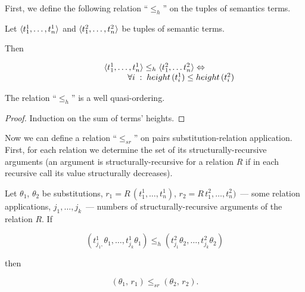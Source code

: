 
First, we define the following relation ``$\leq_h$'' on the tuples of semantics terms.

\begin{definition}
  Let $\langle t_1^1, \dots, t_n^1 \rangle$ and $\langle t_1^2, \dots, t_n^2 \rangle$ be tuples of semantic terms. 

  Then

  \[
  \begin{array}{c}
  \langle t_1^1, \ldots, t_n^1 \rangle \leq_h \langle t_1^2, \ldots t_n^2 \rangle \Leftrightarrow\\
  \phantom{XXXXXXX}\forall i\;:\;height\,(t_i^1) \leq height\,(t_i^2)
  \end{array}
  \]
\end{definition}


\begin{lemma}
\label{lemma:wqo1}
The relation ``$\leq_h$'' is a well quasi-ordering.
\end{lemma}
\begin{proof}
  Induction on the sum of terms' heights.
\end{proof}

Now we can define a relation ``$\leq_{sr}$'' on pairs substitution-relation application. First, for each relation we
determine the set of its structurally-recursive arguments (an argument is structurally-recursive for a relation $R$ if in
each recursive call its value structurally decreases). 

\begin{definition}
  Let $\theta_1$, $\theta_2$ be substitutions, \mbox{$r_1=R\,(t^1_1,\dots,t^1_n)$}, \mbox{$r_2=R\,t^2_1,\dots,t^2_n)$}~--- some relation applications, $j_1, \dots, j_k$~---
  numbers of structurally-recursive arguments of the relation $R$. If

  \[
  (t^1_{j_1,}\theta_1,  \dots,  t^1_{j_k}\theta_1) \leq_h (t^2_{j_1}\theta_2, \dots, t^2_{j_k}\theta_2)
  \]

  then
  
  \[
  (\theta_1,\, r_1) \leq_{sr} (\theta_2,\, r_2).
  \]
\end{definition}

